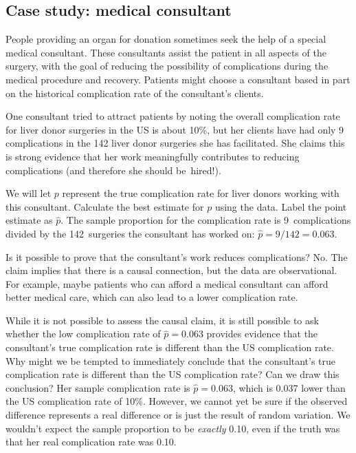 \subsection{Case study: medical consultant}

People providing an organ for donation sometimes seek the help of a special medical consultant. These consultants assist the patient in all aspects of the surgery, with the goal of reducing the possibility of complications during the medical procedure and recovery. Patients might choose a consultant based in part on the historical complication rate of the consultant's clients.

One consultant tried to attract patients by noting the overall complication rate for liver donor surgeries in the US is about 10\%, but her clients have had only 9 complications in the 142 liver donor surgeries she has facilitated. She claims this is strong evidence that her work meaningfully contributes to reducing complications (and therefore she should be~hired!).

\begin{examplewrap}\begin{nexample}{We will let $p$ represent the true complication rate for liver donors working with this consultant. Calculate the best estimate for $p$ using the data.  Label the point estimate as $\hat{p}$.}
The sample proportion for the complication rate is 9~complications divided by the 142~surgeries the consultant has worked on: $\hat{p} = 9 / 142 = 0.063$.
\end{nexample}\end{examplewrap}

\begin{examplewrap}\begin{nexample}{Is it possible to prove that the consultant's work reduces complications?}
No. The claim implies that there is a causal connection, but the data are observational. For example, maybe patients who can afford a medical consultant can afford better medical care, which can also lead to a lower complication rate.
\end{nexample}\end{examplewrap}

\begin{examplewrap}\begin{nexample}{While it is not possible to assess the causal claim, it is still possible to ask whether the low complication rate of $\hat{p} = 0.063$ provides evidence that the consultant's true complication rate is different than the US complication rate. Why might we be tempted to immediately conclude that the consultant's true complication rate is different than the US complication rate? Can we draw this conclusion?}
Her sample complication rate is $\hat{p} = 0.063$, which is 0.037 lower than the US complication rate of 10\%. However, we cannot yet be sure if the observed difference represents a real difference or is just the result of random variation. We wouldn't expect the sample proportion to be \emph{exactly} 0.10, even if the truth was that her real complication rate was 0.10.
\end{nexample}\end{examplewrap}


